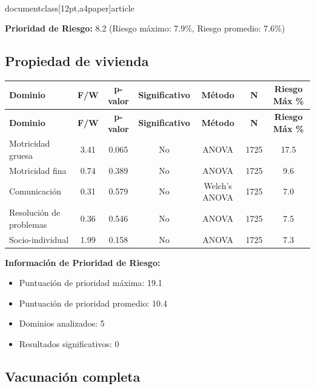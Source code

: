 \\documentclass[12pt,a4paper]{article}
\begin{document}
\textbf{Prioridad de Riesgo:} 8.2 (Riesgo máximo: 7.9\%, Riesgo promedio: 7.6\%)


\vspace{0.5cm}


\subsection{Propiedad de vivienda}


\begin{longtable}{|l|c|c|c|c|c|c|}
\hline
\textbf{Dominio} & \textbf{F/W} & \textbf{p-valor} & \textbf{Significativo} & \textbf{Método} & \textbf{N} & \textbf{Riesgo Máx \%} \\
\hline
\endfirsthead

\hline
\textbf{Dominio} & \textbf{F/W} & \textbf{p-valor} & \textbf{Significativo} & \textbf{Método} & \textbf{N} & \textbf{Riesgo Máx \%} \\
\hline
\endhead

\hline
\endfoot

\hline
\endlastfoot

Motricidad gruesa & 3.41 & 0.065 & No & ANOVA & 1725 & 17.5 \\
Motricidad fina & 0.74 & 0.389 & No & ANOVA & 1725 & 9.6 \\
Comunicación & 0.31 & 0.579 & No & Welch's ANOVA & 1725 & 7.0 \\
Resolución de problemas & 0.36 & 0.546 & No & ANOVA & 1725 & 7.5 \\
Socio-individual & 1.99 & 0.158 & No & ANOVA & 1725 & 7.3 \\

\end{longtable}


\textbf{Información de Prioridad de Riesgo:}
\begin{itemize}
\item Puntuación de prioridad máxima: 19.1
\item Puntuación de prioridad promedio: 10.4
\item Dominios analizados: 5
\item Resultados significativos: 0
\end{itemize}


\subsection{Vacunación completa}
\end{document}
